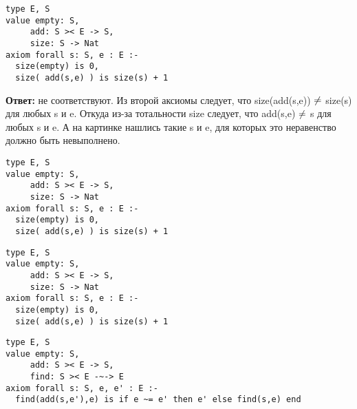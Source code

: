 \z \begin{lstlisting}
type E, S
value empty: S,
     add: S >< E -> S,
     size: S -> Nat
axiom forall s: S, e : E :-
  size(empty) is 0,
  size( add(s,e) ) is size(s) + 1
\end{lstlisting}

\MediumPicture{}

\textbf{Ответ:} не соответствуют. Из второй аксиомы следует, что size(add(s,e)) $\neq$ size(s) для любых s и e. Откуда из-за тотальности size следует, что add(s,e) $\neq$ s для любых s и e. А на картинке нашлись такие s и e, для которых это неравенство должно быть невыполнено.


\z \begin{lstlisting}
type E, S
value empty: S,
     add: S >< E -> S,
     size: S -> Nat
axiom forall s: S, e : E :-
  size(empty) is 0,
  size( add(s,e) ) is size(s) + 1
\end{lstlisting}

\MediumPicture{}

\z \begin{lstlisting}
type E, S
value empty: S,
     add: S >< E -> S,
     size: S -> Nat
axiom forall s: S, e : E :-
  size(empty) is 0,
  size( add(s,e) ) is size(s) + 1
\end{lstlisting}

\MediumPicture{}


\z \begin{lstlisting}
type E, S
value empty: S,
     add: S >< E -> S,
     find: S >< E -~-> E
axiom forall s: S, e, e' : E :-
  find(add(s,e'),e) is if e ~= e' then e' else find(s,e) end
\end{lstlisting}

\MediumPicture{}

